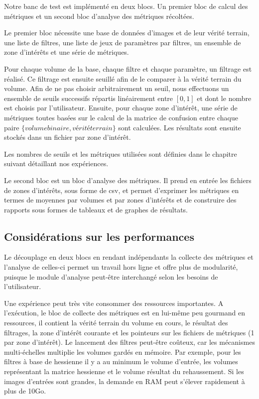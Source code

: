 Notre banc de test est implémenté en deux blocs. Un premier bloc de calcul des métriques et un second bloc d'analyse des métriques récoltées.

Le premier bloc nécessite une base de données d'images et de leur vérité terrain, une liste de filtres, une liste de jeux de paramètres par filtres, un ensemble de zone d'intérêts et une série de métriques.

Pour chaque volume de la base, chaque filtre et chaque paramètre, un filtrage est réalisé. Ce filtrage est ensuite seuillé afin de le comparer à la vérité terrain du volume. Afin de ne pas choisir arbitrairement un seuil, nous effectuons un ensemble de seuils successifs répartis linéairement entre $[0,1]$ et dont le nombre est choisis par l'utilisateur. Ensuite, pour chaque zone d'intérêt, une série de métriques toutes basées sur le calcul de la matrice de confusion entre chaque paire $\{volume binaire, vérité terrain\}$ sont calculées. Les résultats sont ensuite stockés dans un fichier par zone d'intérêt.

Les nombres de seuils et les métriques utilisées sont définies dans le chapitre suivant détaillant nos expériences. 

Le second bloc est un bloc d'analyse des métriques. Il prend en entrée les fichiers de zones d'intérêts, sous forme de csv, et permet d'exprimer les métriques en termes de moyennes par volumes et par zones d'intérêts et de construire des rapports sous formes de tableaux et de graphes de résultats. 

\subsection{Considérations sur les performances}

Le découplage en deux blocs en rendant indépendants la collecte des métriques et l'analyse de celles-ci permet un travail hors ligne et offre plus de modularité, puisque le module d'analyse peut-être interchangé selon les besoins de l'utilisateur. 

Une expérience peut très vite consommer des ressources importantes. A l'exécution, le bloc de collecte des métriques est en lui-même peu gourmand en ressources, il contient la vérité terrain du volume en cours, le résultat des filtrages, la zone d'intérêt courante et les pointeurs sur les fichiers de métriques (1 par zone d'intérêt). Le lancement des filtres peut-être coûteux, car les mécanismes multi-échelles multiplie les volumes gardés en mémoire. Par exemple, pour les filtres à base de hessienne il y a au minimum le volume d'entrée, les volumes représentant la matrice hessienne et le volume résultat du rehaussement. Si les images d'entrées sont grandes, la demande en RAM peut s'élever rapidement à plus de 10Go. 

